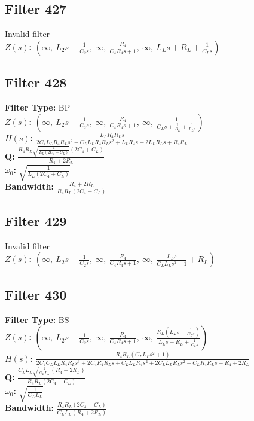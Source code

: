 \documentclass{article}
\begin{document}
\subsection*{Filter 427}
Invalid filter \\ 
\textbf{$Z(s)$:} $\left( \infty, \  L_{2} s + \frac{1}{C_{2} s}, \  \infty, \  \frac{R_{4}}{C_{4} R_{4} s + 1}, \  \infty, \  L_{L} s + R_{L} + \frac{1}{C_{L} s}\right)$ \\ 
\subsection*{Filter 428}
\textbf{Filter Type:} BP \\ 
\textbf{$Z(s)$:} $\left( \infty, \  L_{2} s + \frac{1}{C_{2} s}, \  \infty, \  \frac{R_{4}}{C_{4} R_{4} s + 1}, \  \infty, \  \frac{1}{C_{L} s + \frac{1}{R_{L}} + \frac{1}{L_{L} s}}\right)$ \\ 
\textbf{$H(s)$:} $\frac{L_{L} R_{4} R_{L} s}{2 C_{4} L_{L} R_{4} R_{L} s^{2} + C_{L} L_{L} R_{4} R_{L} s^{2} + L_{L} R_{4} s + 2 L_{L} R_{L} s + R_{4} R_{L}}$ \\ 
\textbf{Q:} $\frac{R_{4} R_{L} \sqrt{\frac{1}{L_{L} \left(2 C_{4} + C_{L}\right)}} \left(2 C_{4} + C_{L}\right)}{R_{4} + 2 R_{L}}$ \\ 
\textbf{$\omega_0$:} $\sqrt{\frac{1}{L_{L} \left(2 C_{4} + C_{L}\right)}}$ \\ 
\textbf{Bandwidth:} $\frac{R_{4} + 2 R_{L}}{R_{4} R_{L} \left(2 C_{4} + C_{L}\right)}$ \\ 
\subsection*{Filter 429}
Invalid filter \\ 
\textbf{$Z(s)$:} $\left( \infty, \  L_{2} s + \frac{1}{C_{2} s}, \  \infty, \  \frac{R_{4}}{C_{4} R_{4} s + 1}, \  \infty, \  \frac{L_{L} s}{C_{L} L_{L} s^{2} + 1} + R_{L}\right)$ \\ 
\subsection*{Filter 430}
\textbf{Filter Type:} BS \\ 
\textbf{$Z(s)$:} $\left( \infty, \  L_{2} s + \frac{1}{C_{2} s}, \  \infty, \  \frac{R_{4}}{C_{4} R_{4} s + 1}, \  \infty, \  \frac{R_{L} \left(L_{L} s + \frac{1}{C_{L} s}\right)}{L_{L} s + R_{L} + \frac{1}{C_{L} s}}\right)$ \\ 
\textbf{$H(s)$:} $\frac{R_{4} R_{L} \left(C_{L} L_{L} s^{2} + 1\right)}{2 C_{4} C_{L} L_{L} R_{4} R_{L} s^{3} + 2 C_{4} R_{4} R_{L} s + C_{L} L_{L} R_{4} s^{2} + 2 C_{L} L_{L} R_{L} s^{2} + C_{L} R_{4} R_{L} s + R_{4} + 2 R_{L}}$ \\ 
\textbf{Q:} $\frac{C_{L} L_{L} \sqrt{\frac{1}{C_{L} L_{L}}} \left(R_{4} + 2 R_{L}\right)}{R_{4} R_{L} \left(2 C_{4} + C_{L}\right)}$ \\ 
\textbf{$\omega_0$:} $\sqrt{\frac{1}{C_{L} L_{L}}}$ \\ 
\textbf{Bandwidth:} $\frac{R_{4} R_{L} \left(2 C_{4} + C_{L}\right)}{C_{L} L_{L} \left(R_{4} + 2 R_{L}\right)}$ \\ 
\end{document}
